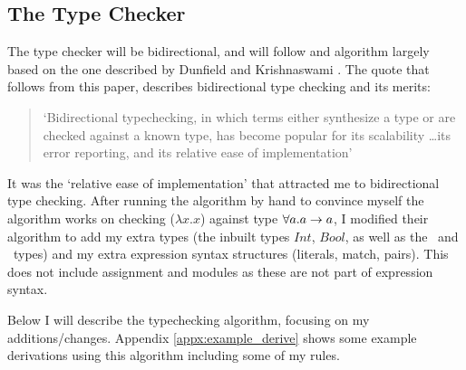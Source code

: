 \subsection{The Type Checker}
The type checker will be bidirectional, and will follow and algorithm largely based on the one described by Dunfield and Krishnaswami \cite{completebidir}. The quote that follows from this paper, describes bidirectional type checking and its merits:
\begin{quote}
`Bidirectional typechecking, in which terms either synthesize a type or are checked against a known type, has become popular for its scalability \ldots its error reporting, and its relative ease of implementation' \cite{completebidir}
\end{quote}
\noindent It was the `relative ease of implementation' that attracted me to bidirectional type checking. After running the algorithm by hand to convince myself the algorithm works on checking ($\lambda x. x$) against type $\forall a.a\rightarrow a$, I modified their algorithm to add my extra types (the inbuilt types $Int$, $Bool$, as well as the \Uniontype\ and \Producttype\ types) and my extra expression syntax structures (literals, match, pairs). This does not include assignment and modules as these are not part of expression syntax. 




\noindent Below I will describe the typechecking algorithm, focusing on my additions/changes. Appendix \ref{appx:example_derive} shows some example derivations using this algorithm including some of my rules. 

